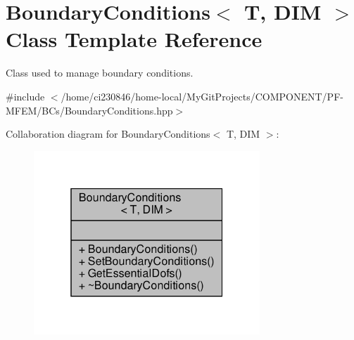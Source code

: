 \hypertarget{classBoundaryConditions}{}\section{Boundary\+Conditions$<$ T, D\+IM $>$ Class Template Reference}
\label{classBoundaryConditions}


Class used to manage boundary conditions.  




{\ttfamily \#include $<$/home/ci230846/home-\/local/\+My\+Git\+Projects/\+C\+O\+M\+P\+O\+N\+E\+N\+T/\+P\+F-\/\+M\+F\+E\+M/\+B\+Cs/\+Boundary\+Conditions.\+hpp$>$}



Collaboration diagram for Boundary\+Conditions$<$ T, D\+IM $>$\+:\nopagebreak
\begin{figure}[H]
\begin{center}
\leavevmode
\includegraphics[width=241pt]{classBoundaryConditions__coll__graph}
\end{center}
\end{figure}
